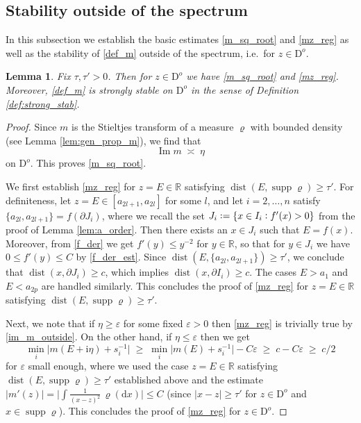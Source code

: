 \documentclass[11pt]{article} %
\numberwithin{equation}{section}
\numberwithin{figure}{section}
\theoremstyle{plain} %
\newtheorem{lemma}[theorem]{Lemma}
\theoremstyle{definition} %
\newcommand{\f}[1]{\boldsymbol{\mathrm{#1}}} %
\newcommand{\R}{\mathbb{R}}
\newcommand{\ii}{\mathrm{i}}
\newcommand{\dd}{\mathrm{d}}
\newcommand{\col}{\mathrel{\vcenter{\baselineskip0.75ex \lineskiplimit0pt \hbox{.}\hbox{.}}}}
\newcommand*{\deq}{\mathrel{\vcenter{\baselineskip0.65ex \lineskiplimit0pt \hbox{.}\hbox{.}}}=}
\renewcommand{\leq}{\leqslant}
\renewcommand{\geq}{\geqslant}
\renewcommand{\epsilon}{\varepsilon}
\newcommand{\h}[1]{\{{#1}\}}
\newcommand{\abs}[1]{\lvert #1 \rvert}
\newcommand{\absb}[1]{\bigl\lvert #1 \bigr\rvert}
\DeclareMathOperator{\supp}{supp}
\DeclareMathOperator{\im}{Im}
\DeclareMathOperator{\dist}{dist}
\begin{document}
\subsection{Stability outside of the spectrum}

In this subsection we establish the basic estimates \eqref{m_sq_root} and \eqref{mz_reg} as well as the stability of \eqref{def_m} outside of the spectrum, i.e.\ for $z \in \f D^o$.

\begin{lemma} \label{lem:stab_outside}
Fix $\tau, \tau' > 0$. Then for $z \in \f D^o$ we have \eqref{m_sq_root} and \eqref{mz_reg}. Moreover, \eqref{def_m} is strongly stable on $\f D^o$ in the sense of Definition \ref{def:strong_stab}.
\end{lemma}

\begin{proof}
Since $m$ is the Stieltjes transform of a measure $\varrho$ with bounded density (see Lemma \ref{lem:gen_prop_m}), we find that
\begin{equation} \label{im_m_outside}
\im m \;\asymp\; \eta
\end{equation}
on $\f D^o$. This proves \eqref{m_sq_root}. 

We first establish \eqref{mz_reg} for $z = E \in \R$ satisfying $\dist(E, \supp \varrho) \geq \tau'$. For definiteness, let $z = E \in [a_{2l+1}, a_{2l}]$ for some $l$, and let $i = 2, \dots, n$ satisfy $\{a_{2l}, a_{2l+1}\} = f(\partial J_i)$, where we recall the set $J_i \deq \h{x \in I_i \col f'(x) > 0}$ from the proof of Lemma \ref{lem:a_order}. Then there exists an $x \in J_i$ such that $E = f(x)$. Moreover, from \eqref{f_der} we get $f'(y) \leq y^{-2}$ for $y \in \R$, so that for $y \in J_i$ we have $0 \leq f'(y) \leq C$ by \eqref{f_der_est}. Since $\dist(E, \{a_{2l}, a_{2l+1}\}) \geq \tau'$, we conclude that $\dist(x, \partial J_i) \geq c$, which implies $\dist(x, \partial I_i) \geq c$. The cases $E > a_1$ and $E < a_{2p}$ are handled similarly. This concludes the proof of \eqref{mz_reg} for $z = E \in \R$ satisfying $\dist(E, \supp \varrho) \geq \tau'$.

Next, we note that if $\eta \geq \epsilon$ for some fixed $\epsilon > 0$ then \eqref{mz_reg} is trivially true by \eqref{im_m_outside}. On the other hand, if $\eta \leq \epsilon$ then we get
\begin{equation*}
\min_i \abs{m(E + \ii \eta) + s_i^{-1}} \;\geq\; \min_i \abs{m(E) + s_i^{-1}} - C \epsilon \;\geq\; c - C \epsilon \;\geq\; c/2
\end{equation*}
for $\epsilon$ small enough, where we used the case $z = E \in \R$ satisfying $\dist(E, \supp \varrho) \geq \tau'$ established above and the estimate $\abs{m'(z)} = \absb{\int \frac{1}{(x - z)^2} \, \varrho(\dd x)} \leq C$ (since $\abs{x - z} \geq \tau'$ for $z \in \f D^o$ and $x \in \supp \varrho$). This concludes the proof of \eqref{mz_reg} for $z \in \f D^o$.


\end{proof}
\end{document}
